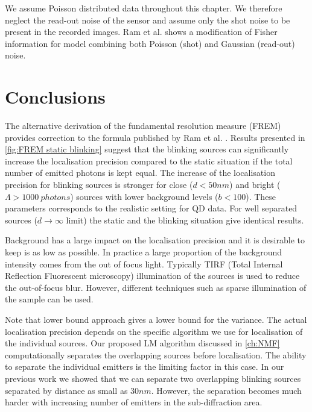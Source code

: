 We assume Poisson distributed data throughout this chapter. We therefore neglect the read-out noise of the sensor and assume only the shot noise to be present in the recorded images. Ram et al. \cite{Ram2006} shows a modification of Fisher information for model combining both Poisson (shot) and Gaussian (read-out) noise.


\clearpage
\section{Conclusions} 

The alternative derivation of the fundamental resolution measure (FREM) provides correction to the formula published by Ram et al. \cite{Ram2006}. Results presented in \autoref{fig:FREM static blinking} suggest that the blinking sources can significantly increase the localisation precision compared to the static situation if the total number of emitted photons is kept equal. The increase of the localisation precision for blinking sources is stronger for close ($d<50\unit{nm}$) and bright ($\Lambda>1000\ \unit{photons}$) sources with lower background levels ($b<100$). These parameters corresponds to the realistic setting for QD data. For well separated sources ($d\rightarrow\infty$ limit) the static and the blinking situation give identical results. 

Background has a large impact on the localisation precision and it is desirable to keep is as low as possible. In practice a large proportion of the background intensity comes from the out of focus light. Typically TIRF (Total Internal Reflection Fluorescent microscopy) illumination of the sources is used to reduce the out-of-focus blur. However, different techniques such as sparse illumination of the sample can be used. 

Note that \CR lower bound approach gives a lower bound for the variance. The actual localisation precision depends on the specific algorithm we use for localisation of the individual sources. Our proposed LM algorithm discussed in \autoref{ch:NMF} computationally separates the overlapping sources before localisation. The ability to separate the individual emitters is the limiting factor in this case. In our previous work \cite{Mandula2010b} we showed that we can separate two overlapping blinking sources separated by distance as small as $30\unit{nm}$. However, the separation becomes much harder with increasing number of emitters in the sub-diffraction area.  

